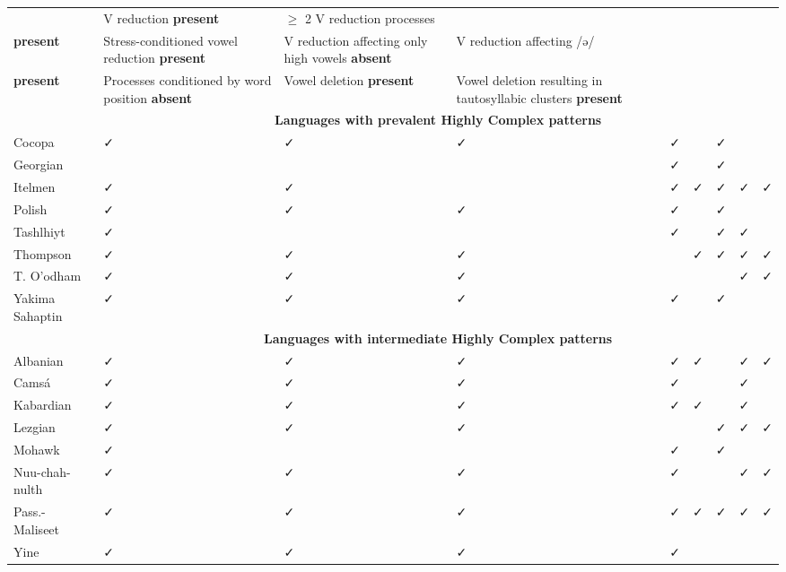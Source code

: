\begin{table}
\begin{tabularx}{\textwidth}{XXXXXXXXX}
\lsptoprule
 & V reduction \textbf{present} & { ${\geq}$ 2 V reduction processes}\\

 \textbf{present} & Stress-conditioned vowel reduction \textbf{present} & V reduction affecting only high vowels \textbf{absent} & { V reduction affecting  /ə/}\\

 \textbf{present} & Processes conditioned by word position \textbf{absent} & Vowel deletion \textbf{present} & Vowel deletion resulting in tautosyllabic clusters \textbf{present}\\
& \multicolumn{8}{c}{ \textbf{Languages with prevalent Highly Complex patterns}}\\
\hhline{~--------}
 Cocopa & ✓ & ✓ & ✓ & ✓ &  & ✓ &  & \\
\hhline{~--------}
 Georgian &  &  &  & ✓ &  & ✓ &  & \\
\hhline{~--------}
 Itelmen & ✓ & ✓ &  & ✓ & ✓ & ✓ & ✓ & ✓\\
\hhline{~--------}
 Polish & ✓ & { ✓} & ✓ & ✓ &  & ✓ &  & \\
\hhline{~--------}
 Tashlhiyt & ✓ &  &  & ✓ &  & ✓ & ✓ & \\
\hhline{~--------}
 Thompson & ✓ & ✓ & ✓ &  & ✓ & ✓ & ✓ & ✓\\
\hhline{~--------}
 T. O’odham & ✓ & ✓ & ✓ &  &  &  & ✓ & ✓\\
\hhline{~--------}
 Yakima Sahaptin & ✓ & { ✓} & ✓ & ✓ &  & ✓ &  & \\
& \multicolumn{8}{c}{ \textbf{Languages with intermediate Highly Complex patterns}}\\
\hhline{~--------}
 Albanian & ✓ & ✓ & ✓ & ✓ & ✓ &  & ✓ & ✓\\
\hhline{~--------}
 Camsá & ✓ & ✓ & ✓ & ✓ &  &  & ✓ & \\
\hhline{~--------}
 Kabardian & ✓ & ✓ & ✓ & ✓ & ✓ &  & ✓ & \\
\hhline{~--------}
 Lezgian & ✓ & ✓ & ✓ &  &  & ✓ & ✓ & ✓\\
\hhline{~--------}
 Mohawk & ✓ &  &  & ✓ &  & ✓ &  & \\
\hhline{~--------}
 Nuu-chah-nulth & ✓ & ✓ & ✓ & ✓ &  &  & ✓ & ✓\\
\hhline{~--------}
 Pass.-Maliseet & ✓ & ✓ & ✓ & ✓ & ✓ & ✓ & ✓ & ✓\\
\hhline{~--------}
 Yine & ✓ & ✓ & ✓ & ✓ &  &  &  & \\

\end{tabularx}
\end{table}

